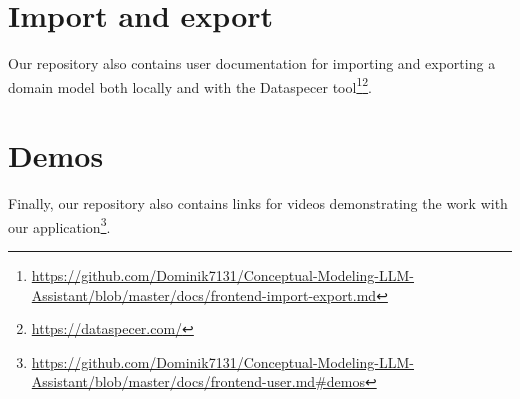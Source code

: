\section{Import and export}

Our repository also contains user documentation for importing and exporting a domain model both locally and with the Dataspecer tool\footnote{\url{https://github.com/Dominik7131/Conceptual-Modeling-LLM-Assistant/blob/master/docs/frontend-import-export.md}}\footnote{\url{https://dataspecer.com/}}.


\section{Demos}

Finally, our repository also contains links for videos demonstrating the work with our application\footnote{\url{https://github.com/Dominik7131/Conceptual-Modeling-LLM-Assistant/blob/master/docs/frontend-user.md\#demos}}.

